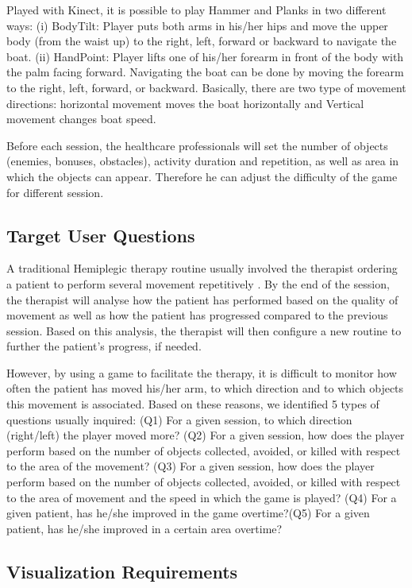 \documentclass{vgtc}                          %
\begin{document}
Played with Kinect, it is possible to play Hammer and Planks in two different ways: (i) BodyTilt: Player puts both arms in his/her hips and move the upper body (from the waist up) to the right, left, forward or backward to navigate the boat. (ii) HandPoint: Player lifts one of his/her forearm in front of the body with the palm facing forward. Navigating the boat can be done by moving the forearm to the right, left, forward, or backward. Basically, there are two type of movement directions: horizontal movement moves the boat horizontally and Vertical movement changes boat speed.

Before each session, the healthcare professionals will set the number of objects (enemies, bonuses, obstacles), activity duration and repetition, as well as area in which the objects can appear. Therefore he can adjust the difficulty of the game for different session.

\subsection{Target User Questions}

A traditional Hemiplegic therapy routine usually involved the therapist ordering a patient to perform several movement repetitively \cite{rahman}. By the end of the session, the therapist will analyse how the patient has performed based on the quality of movement as well as how the patient has progressed compared to the previous session. Based on this analysis, the therapist will then configure a new routine to further the patient's progress, if needed.

However, by using a game to facilitate the therapy, it is difficult to monitor how often the patient has moved his/her arm, to which direction and to which objects this movement is associated. Based on these reasons, we identified 5 types of questions usually inquired: (Q1) For a given session, to which direction (right/left) the player moved more? (Q2) For a given session, how does the player perform based on the number of objects collected, avoided, or killed with respect to the area of the movement? (Q3) For a given session, how does the player perform based on the number of objects collected, avoided, or killed with respect to the area of movement and the speed in which the game is played? (Q4) For a given patient, has he/she improved in the game overtime?(Q5) For a given patient, has he/she improved in a certain area overtime?

\subsection{Visualization Requirements}
\end{document}
